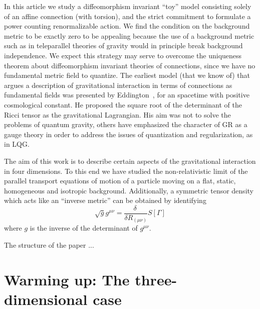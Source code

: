 \documentclass[twocolumn,
  showpacs,showkeys,prd,superscriptaddress]{revtex4-1}
\newcommand{\hl}[1]{{\color{red} \textbf{#1}}}
\begin{document}
In this article we study a diffeomorphism invariant ``toy'' model  consisting  solely of an affine connection  (with torsion), and the strict commitment to formulate a power counting renormalizable action.  We find the condition on the background metric to be exactly zero to be appealing because the use of a background metric such as in teleparallel theories of gravity would in principle break background independence. We expect  this strategy may serve to overcome  the uniqueness theorem about diffeomorphism invariant theories of connections, since we  have no fundamental metric field to quantize. The earliest model (that we know of) that argues  a description of gravitational interaction in terms of connections as fundamental fields  was presented by Eddington~\cite{Eddington1923math}, for an spacetime with positive cosmological constant. He proposed the square root of the determinant of the Ricci tensor as the gravitational Lagrangian. His aim was not to solve the problems of quantum gravity,  others have emphasized the character of GR as a gauge theory in order to address the issues of quantization and regularization, as in LQG.

The aim of this work is to describe certain aspects of the gravitational interaction in four dimensions. To this end we have studied the non-relativistic limit of the parallel transport equations of motion of a particle moving on a flat, static, homogeneous and isotropic background. Additionally, a  symmetric tensor density which acts like an ``inverse metric'' can be obtained by identifying
\begin{equation}\label{metric}
  \sqrt{g}g^{\mu\nu} = \frac{\delta\ }{\delta R_{(\mu\nu)}} S[\Gamma]
\end{equation}
where $g$ is the inverse of the determinant of $g^{\mu\nu}$.

The structure of the paper ...




\section{Warming up: The three-dimensional case}
\end{document}

